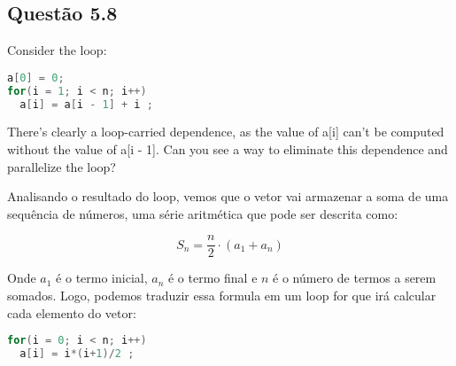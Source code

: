 
\subsection{Questão 5.8}

Consider the loop:
\begin{lstlisting}[language=C]
a[0] = 0;
for(i = 1; i < n; i++)
  a[i] = a[i - 1] + i ;
\end{lstlisting}

There’s clearly a loop-carried dependence, as the value of a[i] can’t be computed without the value of a[i - 1]. Can you see a way to eliminate this dependence and parallelize the loop?

Analisando o resultado do loop, vemos que o vetor vai armazenar a soma de uma sequência de números, uma série aritmética que pode ser descrita como:

\begin{equation}
  S_{n} = \frac{n}{2} \cdot (a_{1} + a_{n})
\end{equation}

Onde $a_{1}$ é o termo inicial, $a_{n}$ é o termo final e $n$ é o número de termos a serem somados. Logo, podemos traduzir essa formula em um loop for que irá calcular cada elemento do vetor:

\begin{lstlisting}[language=C]
for(i = 0; i < n; i++)
  a[i] = i*(i+1)/2 ;
\end{lstlisting}



